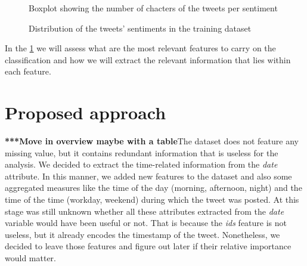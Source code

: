 \documentclass[conference]{IEEEtran}
\begin{document}
\begin{figure}[h]
        \centering
        
        \caption{Boxplot showing the number of chacters of the tweets per sentiment}
        \label{fig:charcount}
\end{figure}
\begin{figure}[h]
        \centering
        
        \caption{Distribution of the tweets' sentiments in the training dataset}
        \label{fig:unbalanced}
\end{figure}
In the \ref{sec:approach} we will assess what are the most relevant features to carry on the classification and how we will extract the relevant information that lies within each feature.

\section{Proposed approach}\label{sec:approach}
\textbf{***Move in overview maybe with a table}The dataset does not feature any missing value, but it contains redundant information that is useless for the analysis. We decided to extract the time-related information from the \textit{date} attribute. In this manner, we added new features to the dataset and also some aggregated measures like the time of the day (morning, afternoon, night) and the time of the time (workday, weekend) during which the tweet was posted. At this stage was still unknown whether all these attributes extracted from the \textit{date} variable would have been useful or not. That is because the \textit{ids} feature is not useless, but it already encodes the timestamp of the tweet. Nonetheless, we decided to leave those features and figure out later if their relative importance would matter.
\end{document}
